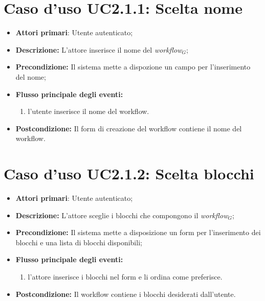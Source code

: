 		\section{Caso d'uso UC2.1.1: Scelta nome }
		\begin{itemize}
			\item \textbf{Attori primari}: Utente autenticato;
			\item \textbf{Descrizione:} L'attore inserisce il nome del \textit{workflow$_{G}$};
			\item \textbf{Precondizione:} Il sistema mette a dispozione un campo per l'inserimento del nome;
			\item \textbf{Flusso principale degli eventi:}
			\begin{enumerate}
				\item l'utente inserisce il nome del workflow.
			\end{enumerate}
			\item \textbf{Postcondizione:} Il form di creazione del workflow contiene il nome del workflow.
		\end{itemize}
		\section{Caso d'uso UC2.1.2: Scelta blocchi }
		\begin{itemize}
			\item \textbf{Attori primari}: Utente autenticato;
			\item \textbf{Descrizione:} L'attore sceglie i blocchi che compongono il \textit{workflow$_{G}$};
			\item \textbf{Precondizione:} Il sistema mette a disposizione un form per l'inserimento dei blocchi e una lista di blocchi disponibili;
			\item \textbf{Flusso principale degli eventi:}
			\begin{enumerate}
				\item l'attore inserisce i blocchi nel form e li ordina come preferisce.
			\end{enumerate}
			\item \textbf{Postcondizione:} Il workflow contiene i blocchi desiderati dall'utente.
		\end{itemize}
